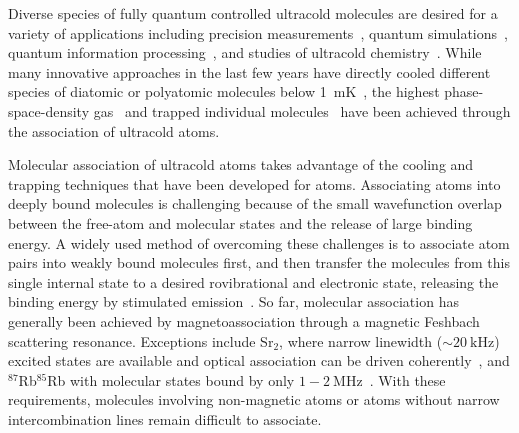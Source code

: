 \documentclass[aps,prl,twocolumn,10pt,superscriptaddress]{revtex4-1}
\begin{document}
Diverse species of fully quantum controlled  ultracold molecules are desired
for a variety of applications including precision measurements~\cite{
  Kondov2019,Nick_and_Ivan2017, PhysRevA.101.042504, Andreev2018,
  PhysRevLett.119.153001, hudson2011},
quantum simulations~\cite{Micheli2006, Yao2018, Wall2015, wall2015realizing},
quantum information processing~\cite{DeMille2002, Ni2018, Hudson2018, Lin2019},
and studies of ultracold chemistry~\cite{Bala2016,Hu1111,Segev2019,deJongh626}.
While many innovative approaches in the last few years
have directly cooled different species of diatomic or polyatomic molecules
below 1~mK~\cite{Norrgard2016,Anderegg2018, Mitra1366, PhysRevX.10.021049,
  PhysRevLett.121.013202, Truppe2017},
the highest phase-space-density gas~\cite{Demarco2018} and
trapped individual molecules~\cite{Zhang2020,He331}
have been achieved through the association of ultracold atoms.

Molecular association of ultracold atoms takes advantage of the cooling and trapping techniques
that have been developed for atoms.
Associating atoms into deeply bound molecules is challenging
because of the small wavefunction overlap between the free-atom and molecular states
and the release of large binding energy.
A widely used method of overcoming these challenges is to associate atom pairs
into weakly bound molecules first,
and then transfer the molecules from this single internal state
to a desired rovibrational and electronic state,
releasing the binding energy by stimulated emission~\cite{Danzl2008, Ni2008, Lang2008,
  Takekoshi2014, Molony2014, Park2015, Guo2016, Kondov2019, Voges2020}.
So far, molecular association has generally been achieved by magnetoassociation
through a magnetic Feshbach scattering resonance.
Exceptions include Sr$_2$, where narrow linewidth ($\sim 20~\mathrm{kHz}$) excited states
are available and optical association can be driven coherently~\cite{Reinaudi2012,Stellmer2012},
and $^{87}$Rb$^{85}$Rb with molecular states bound by only $1-2~\mathrm{MHz}$~\cite{He331}.
With these requirements, molecules involving non-magnetic atoms
or atoms without narrow intercombination lines remain difficult to associate.
\end{document}
